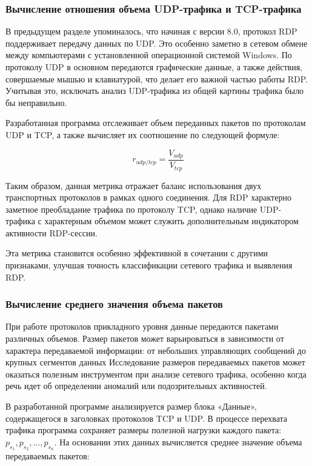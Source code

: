 \documentclass[bachelor, och, coursework]{SCWorks}
\begin{document}
\subsubsection{Вычисление отношения объема UDP-трафика и TCP-трафика}

В предыдущем разделе упоминалось, что начиная с версии 8.0, протокол RDP поддерживает передачу данных по UDP. Это особенно заметно в 
сетевом обмене между компьютерами с установленной операционной системой Windows. По протоколу UDP в основном передаются графические данные, 
а также действия, совершаемые мышью и клавиатурой, что делает его важной частью работы RDP. Учитывая это, исключать анализ UDP-трафика из 
общей картины трафика было бы неправильно.

Разработанная программа отслеживает объем переданных пакетов по протоколам UDP и TCP, а также вычисляет их соотношение по следующей формуле:

\begin{equation}
  r_{udp/tcp} = \frac{V_{udp}}{V_{tcp}}
\end{equation}

Таким образом, данная метрика отражает баланс использования двух транспортных протоколов в рамках одного соединения. Для RDP характерно 
заметное преобладание трафика по протоколу TCP, однако наличие UDP-трафика с характерным объемом может служить дополнительным индикатором 
активности RDP-сессии.

Эта метрика становится особенно эффективной в сочетании с другими признаками, улучшая точность классификации сетевого трафика и выявления RDP.

\subsubsection{Вычисление среднего значения объема пакетов}

При работе протоколов прикладного уровня данные передаются пакетами различных объемов. 
Размер пакетов может варьироваться в зависимости от характера передаваемой информации: от небольших управляющих сообщений до крупных сегментов данных
Исследование размеров передаваемых пакетов может оказаться полезным инструментом при анализе сетевого 
трафика, особенно когда речь идет об определении аномалий или подозрительных активностей.


В разработанной программе анализируется размер блока «Данные», содержащегося в заголовках протоколов TCP и UDP. В процессе перехвата 
трафика программа сохраняет размеры полезной нагрузки каждого пакета: \\ $p_{s_1}, p_{s_2}, \dots, p_{s_n}$. На основании этих данных 
вычисляется среднее значение объема передаваемых пакетов:
\end{document}
